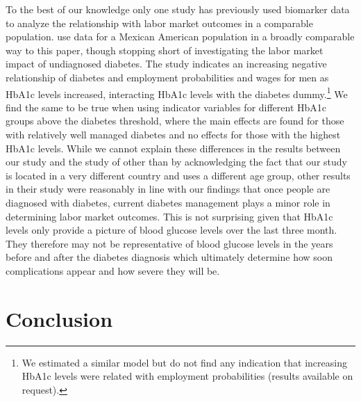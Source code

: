 \documentclass[12pt,english,british]{article}
\begin{document}
To the best of our knowledge only one study has previously used biomarker data to analyze the relationship with labor market outcomes in a comparable population. \citet{BrownIII2011} use data for a Mexican American
population in a broadly comparable way to this paper, though stopping short of investigating
the labor market impact of undiagnosed diabetes. The study indicates
an increasing negative relationship of diabetes and employment
probabilities and wages for men as \ac{HbA1c} levels increased, interacting \ac{HbA1c} levels
with the diabetes dummy.\footnote{We estimated a similar model but
do not find any indication that increasing \ac{HbA1c} levels were
related with employment probabilities (results available on request).} We
find the same to be true when using indicator variables for different
\ac{HbA1c} groups above the diabetes threshold, where the main effects
are found for those with relatively well managed diabetes and no
effects for those with the highest \ac{HbA1c} levels. While we cannot explain these differences in the results between our study and the study of \citet{BrownIII2011} other than by acknowledging the fact that our study is located in a very different country and uses a different age group, other results in their study were reasonably in line with our findings that once people are diagnosed with diabetes, current diabetes management plays a minor role in determining labor market outcomes. This is not surprising given that \ac{HbA1c} levels only provide a picture of blood glucose levels over the last three month. They therefore may not be representative of blood glucose levels in the years before and after the diabetes diagnosis which ultimately determine how soon complications appear and how severe they will be.

\section{\label{sec:Conclusion}Conclusion}
\end{document}
